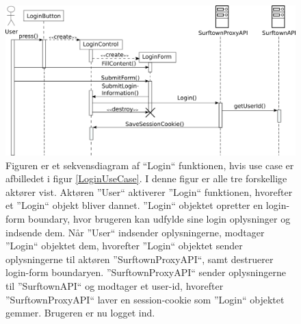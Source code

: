 \documentclass[12pt]{article}
\begin{document}
\begin{figure}
	\centering
	\includegraphics[width=13cm]{sekvens_diagrammer/login.png}
	\caption{Figuren er et sekvensdiagram af ``Login`` funktionen, hvis use case er afbilledet i figur \ref{LoginUseCase}. I denne figur er alle tre forskellige aktører vist. Aktøren ''User`` aktiverer ''Login`` funktionen, hvorefter et ''Login`` objekt bliver dannet. ''Login`` objektet opretter en login-form boundary, hvor brugeren kan udfylde sine login oplysninger og indsende dem. Når ''User`` indsender oplysningerne, modtager ''Login`` objektet dem, hvorefter ''Login`` objektet sender oplysningerne til aktøren ''SurftownProxyAPI``, samt destruerer login-form boundaryen. ''SurftownProxyAPI`` sender oplysningerne til ''SurftownAPI`` og modtager et user-id, hvorefter ''SurftownProxyAPI`` laver en session-cookie som ''Login`` objektet gemmer. Brugeren er nu logget ind.}
	\label{fig:Login}
\end{figure}
\end{document}
